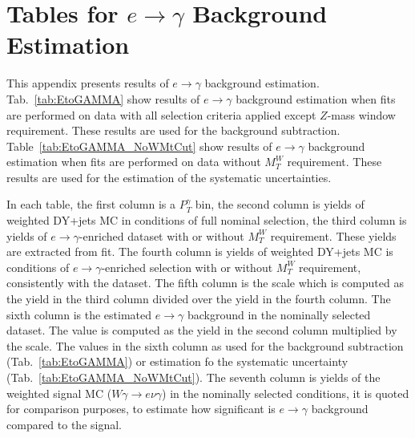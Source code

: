 \chapter{Tables for $e\rightarrow\gamma$ Background Estimation}
\label{sec:etogTables}

This appendix presents results of $e\rightarrow\gamma$ background estimation. Tab.~\ref{tab:EtoGAMMA} show results of $e\rightarrow\gamma$ background estimation when fits are performed on data with all selection criteria applied except $Z$-mass window requirement. These results are used for the background subtraction. Table~\ref{tab:EtoGAMMA_NoWMtCut} show results of $e\rightarrow\gamma$ background estimation when fits are performed on data without $M_T^W$ requirement. These results are used for the estimation of the systematic uncertainties.

In each table, the first column is a $P_T^{\gamma}$ bin, the second column is yields of weighted DY+jets MC in conditions of full nominal selection, the third column is yields of $e\rightarrow\gamma$-enriched dataset with or without $M_T^W$ requirement. These yields are extracted from fit. The fourth column is yields of weighted DY+jets MC is conditions of $e\rightarrow\gamma$-enriched selection with or without $M_T^W$ requirement, consistently with the dataset. The fifth column is the scale which is computed as the yield in the third column divided over the yield in the fourth column. The sixth column is the estimated $e\rightarrow\gamma$ background in the nominally selected dataset. The value is computed as the yield in the second column multiplied by the scale. The values in the sixth column as used for the background subtraction  (Tab.~\ref{tab:EtoGAMMA}) or estimation fo the systematic uncertainty (Tab.~\ref{tab:EtoGAMMA_NoWMtCut}). The seventh column is yields of the weighted signal MC ($W\gamma\rightarrow e\nu\gamma$) in the nominally selected conditions, it is quoted for comparison purposes, to estimate how significant is $e\rightarrow\gamma$ background compared to the signal.

